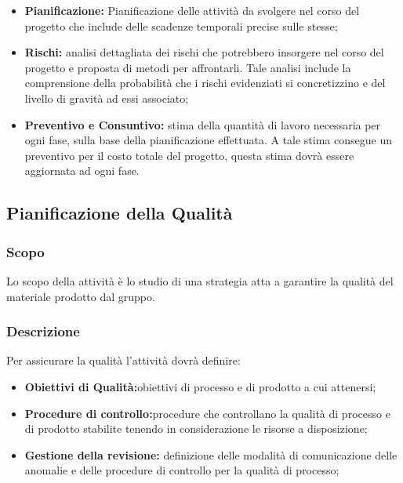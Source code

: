 \documentclass[../NormediProgetto.tex]{subfiles}
\begin{document}
\begin{itemize}
	    
	\item \textbf{Pianificazione:} Pianificazione delle attività da svolgere nel corso del progetto che include delle scadenze temporali precise sulle stesse;
	
    \item \textbf{Rischi:} analisi dettagliata dei rischi che potrebbero insorgere nel corso del progetto e proposta di metodi per affrontarli. Tale analisi include la comprensione della probabilità che i rischi evidenziati si concretizzino e del livello di gravità ad essi associato;

    \item \textbf{Preventivo e Consuntivo:} stima della quantità di lavoro necessaria per ogni fase, sulla base della pianificazione effettuata. A tale stima consegue un preventivo per il costo totale del progetto, questa stima dovrà essere aggiornata ad ogni fase.
    
\end{itemize}


\subsection{Pianificazione della Qualità}

\subsubsection{Scopo}

Lo scopo della attività è lo studio di una strategia atta a garantire la qualità del materiale prodotto dal gruppo. 

\subsubsection{Descrizione}

Per assicurare la qualità l'attività dovrà definire:

\begin{itemize}
	    
	\item \textbf{Obiettivi di Qualità:}obiettivi di processo e di prodotto a cui attenersi;
	
    \item \textbf{Procedure di controllo:}procedure che controllano la qualità di processo e di prodotto stabilite tenendo in considerazione le risorse a disposizione;

    \item \textbf{Gestione della revisione:} definizione delle modalità di comunicazione delle anomalie e delle procedure di controllo per la qualità di processo;
\end{itemize}
\end{document}
